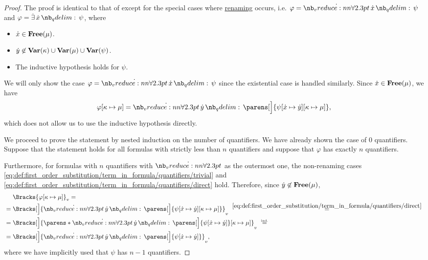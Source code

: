 \begin{proof}
   The proof is identical to that of  except for the special cases where \hyperref[rem:first_order_substitution_renaming_justification]{renaming} occurs, i.e. \( \varphi = \qforall \synx \psi \) and \( \varphi = \qexists \synx \psi \), where
  \begin{itemize}
    \item \( \synx \in \op*{Free}(\mu) \).
    \item \( \syny \not\in \op*{Var}(\kappa) \cup \op*{Var}(\mu) \cup \op*{Var}(\psi) \).
    \item The inductive hypothesis holds for \( \psi \).
  \end{itemize}

  We will only show the case \( \varphi = \qforall \synx \psi \) since the existential case is handled similarly. Since \( \synx \in \op*{Free}(\mu) \), we have
  \begin{equation*}
    \varphi[\kappa \mapsto \mu]
    =
    \qforall \syny \parens[\Big]{ \psi[\synx \mapsto \syny][\kappa \mapsto \mu] },
  \end{equation*}
  which does not allow us to use the inductive hypothesis directly.

  We proceed to prove the statement by nested induction on the number of quantifiers. We have already shown the case of \( 0 \) quantifiers. Suppose that the statement holds for all formulas with strictly less than \( n \) quantifiers and suppose that \( \varphi \) has exactly \( n \) quantifiers.

  Furthermore, for formulas with \( n \) quantifiers with \( \synforall \) as the outermost one, the non-renaming cases \eqref{eq:def:first_order_substitution/term_in_formula/quantifiers/trivial} and \eqref{eq:def:first_order_substitution/term_in_formula/quantifiers/direct} hold. Therefore, since \( \syny \not\in \op*{Free}(\mu) \),
  \begin{equation}\label{eq:thm:first_order_substitution_equivalence/term_in_formula/nested_induction}
    \begin{aligned}
      &\phantom{{}={}}
      \Bracks{\varphi[\kappa \mapsto \mu]}_v
      = \\ &=
      \Bracks[\Big]{\qforall \syny \parens[\Big]{ \psi[\synx \mapsto \syny][\kappa \mapsto \mu] }}_v
      \reloset {\eqref{eq:def:first_order_substitution/term_in_formula/quantifiers/direct}} = \\ &=
      \Bracks[\Big]{ \parens*{ \qforall \syny \parens[\Big]{ \psi[\synx \mapsto \syny] } }[\kappa \mapsto \mu] }_v
      \reloset {\T{ind.}} = \\ &=
      \Bracks[\Big]{\qforall \syny \parens[\Big]{ \psi[\synx \mapsto \syny] } }_v,
    \end{aligned}
  \end{equation}
  where we have implicitly used that \( \psi \) has \( n - 1 \) quantifiers.


\end{proof}

